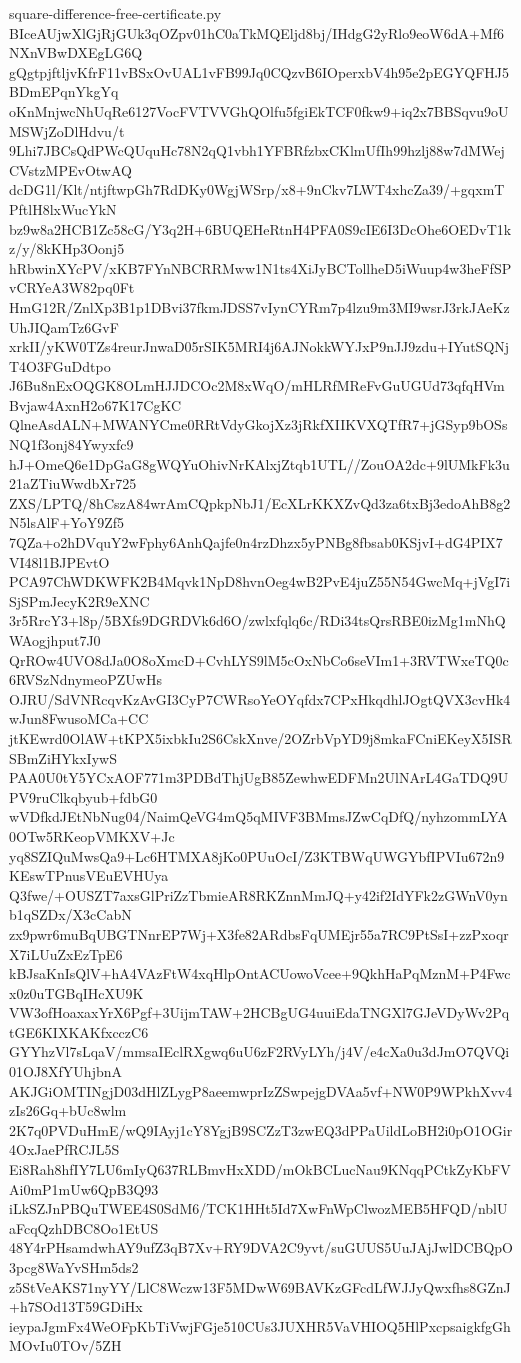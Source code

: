 \documentclass[11pt]{article}
\theoremstyle{definition}
\theoremstyle{remark}
\begin{document}
\begin{filecontents*}[overwrite]{square-difference-free-certificate.py}
BIceAUjwXlGjRjGUk3qOZpv01hC0aTkMQEljd8bj/IHdgG2yRlo9eoW6dA+Mf6NXnVBwDXEgLG6Q
gQgtpjftljvKfrF11vBSxOvUAL1vFB99Jq0CQzvB6IOperxbV4h95e2pEGYQFHJ5BDmEPqnYkgYq
oKnMnjwcNhUqRe6127VocFVTVVGhQOlfu5fgiEkTCF0fkw9+iq2x7BBSqvu9oUMSWjZoDlHdvu/t
9Lhi7JBCsQdPWcQUquHc78N2qQ1vbh1YFBRfzbxCKlmUfIh99hzlj88w7dMWejCVstzMPEvOtwAQ
dcDG1l/Klt/ntjftwpGh7RdDKy0WgjWSrp/x8+9nCkv7LWT4xhcZa39/+gqxmTPftlH8lxWucYkN
bz9w8a2HCB1Zc58cG/Y3q2H+6BUQEHeRtnH4PFA0S9cIE6I3DcOhe6OEDvT1kz/y/8kKHp3Oonj5
hRbwinXYcPV/xKB7FYnNBCRRMww1N1ts4XiJyBCTollheD5iWuup4w3heFfSPvCRYeA3W82pq0Ft
HmG12R/ZnlXp3B1p1DBvi37fkmJDSS7vIynCYRm7p4lzu9m3MI9wsrJ3rkJAeKzUhJIQamTz6GvF
xrkII/yKW0TZs4reurJnwaD05rSIK5MRI4j6AJNokkWYJxP9nJJ9zdu+IYutSQNjT4O3FGuDdtpo
J6Bu8nExOQGK8OLmHJJDCOc2M8xWqO/mHLRfMReFvGuUGUd73qfqHVmBvjaw4AxnH2o67K17CgKC
QlneAsdALN+MWANYCme0RRtVdyGkojXz3jRkfXIIKVXQTfR7+jGSyp9bOSsNQ1f3onj84Ywyxfc9
hJ+OmeQ6e1DpGaG8gWQYuOhivNrKAlxjZtqb1UTL//ZouOA2dc+9lUMkFk3u21aZTiuWwdbXr725
ZXS/LPTQ/8hCszA84wrAmCQpkpNbJ1/EcXLrKKXZvQd3za6txBj3edoAhB8g2N5lsAlF+YoY9Zf5
7QZa+o2hDVquY2wFphy6AnhQajfe0n4rzDhzx5yPNBg8fbsab0KSjvI+dG4PIX7VI48l1BJPEvtO
PCA97ChWDKWFK2B4Mqvk1NpD8hvnOeg4wB2PvE4juZ55N54GwcMq+jVgI7iSjSPmJecyK2R9eXNC
3r5RrcY3+l8p/5BXfs9DGRDVk6d6O/zwlxfqlq6c/RDi34tsQrsRBE0izMg1mNhQWAogjhput7J0
QrROw4UVO8dJa0O8oXmcD+CvhLYS9lM5cOxNbCo6seVIm1+3RVTWxeTQ0c6RVSzNdnymeoPZUwHs
OJRU/SdVNRcqvKzAvGI3CyP7CWRsoYeOYqfdx7CPxHkqdhlJOgtQVX3cvHk4wJun8FwusoMCa+CC
jtKEwrd0OlAW+tKPX5ixbkIu2S6CskXnve/2OZrbVpYD9j8mkaFCniEKeyX5ISRSBmZiHYkxIywS
PAA0U0tY5YCxAOF771m3PDBdThjUgB85ZewhwEDFMn2UlNArL4GaTDQ9UPV9ruClkqbyub+fdbG0
wVDfkdJEtNbNug04/NaimQeVG4mQ5qMIVF3BMmsJZwCqDfQ/nyhzommLYA0OTw5RKeopVMKXV+Jc
yq8SZIQuMwsQa9+Lc6HTMXA8jKo0PUuOcI/Z3KTBWqUWGYbfIPVIu672n9KEswTPnusVEuEVHUya
Q3fwe/+OUSZT7axsGlPriZzTbmieAR8RKZnnMmJQ+y42if2IdYFk2zGWnV0ynb1qSZDx/X3cCabN
zx9pwr6muBqUBGTNnrEP7Wj+X3fe82ARdbsFqUMEjr55a7RC9PtSsI+zzPxoqrX7iLUuZxEzTpE6
kBJsaKnIsQlV+hA4VAzFtW4xqHlpOntACUowoVcee+9QkhHaPqMznM+P4Fwcx0z0uTGBqIHcXU9K
VW3ofHoaxaxYrX6Pgf+3UijmTAW+2HCBgUG4uuiEdaTNGXl7GJeVDyWv2PqtGE6KIXKAKfxcczC6
GYYhzVl7sLqaV/mmsaIEclRXgwq6uU6zF2RVyLYh/j4V/e4cXa0u3dJmO7QVQi01OJ8XfYUhjbnA
AKJGiOMTINgjD03dHlZLygP8aeemwprIzZSwpejgDVAa5vf+NW0P9WPkhXvv4zIs26Gq+bUc8wlm
2K7q0PVDuHmE/wQ9IAyj1cY8YgjB9SCZzT3zwEQ3dPPaUildLoBH2i0pO1OGir4OxJaePfRCJL5S
Ei8Rah8hfIY7LU6mIyQ637RLBmvHxXDD/mOkBCLucNau9KNqqPCtkZyKbFVAi0mP1mUw6QpB3Q93
iLkSZJnPBQuTWEE4S0SdM6/TCK1HHt5Id7XwFnWpClwozMEB5HFQD/nblUaFcqQzhDBC8Oo1EtUS
48Y4rPHsamdwhAY9ufZ3qB7Xv+RY9DVA2C9yvt/suGUUS5UuJAjJwlDCBQpO3pcg8WaYvSHm5ds2
z5StVeAKS71nyYY/LlC8Wczw13F5MDwW69BAVKzGFcdLfWJJyQwxfhs8GZnJ+h7SOd13T59GDiHx
ieypaJgmFx4WeOFpKbTiVwjFGje510CUs3JUXHR5VaVHIOQ5HlPxcpsaigkfgGhMOvIu0TOv/5ZH

\end{filecontents*}
\end{document}
